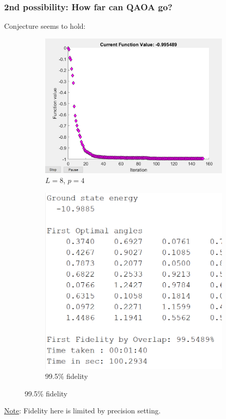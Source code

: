 \documentclass{beamer}
\theoremstyle{definition}
\begin{document}
\begin{frame}
\frametitle{2nd possibility: How far can QAOA go?}



Conjecture seems to hold:


\begin{figure}[!htb]
	\centering
	\begin{subfigure}{0.5 \textwidth}
		\centering
		\includegraphics[scale=0.4]{N8p4.PNG}
		\caption{$L=8$, $p=4$}
	\end{subfigure}%
	\begin{subfigure}{0.5 \textwidth}
		\centering
		\includegraphics[scale=0.46]{N8p4_out}
		\caption{99.5\% fidelity}
	\end{subfigure}

\end{figure}

\underline{Note}: Fidelity here is limited by precision setting.

\end{frame}
\end{document}
